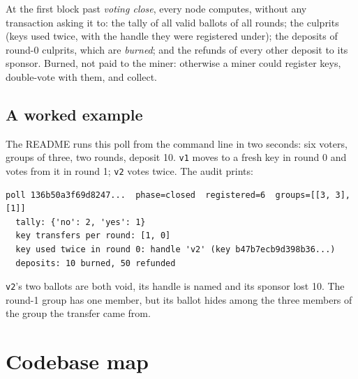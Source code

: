 \documentclass[11pt,a4paper]{article}
\theoremstyle{definition}
\begin{document}
At the first block past \emph{voting close}, every node computes, without
any transaction asking it to: the tally of all valid ballots of all
rounds; the culprits (keys used twice, with the handle they were
registered under); the deposits of round-0 culprits, which are
\emph{burned}; and the refunds of every other deposit to its sponsor.
Burned, not paid to the miner: otherwise a miner could register keys,
double-vote with them, and collect.

\subsection{A worked example}

The README runs this poll from the command line in two seconds: six
voters, groups of three, two rounds, deposit 10. \texttt{v1} moves to a
fresh key in round 0 and votes from it in round 1; \texttt{v2} votes twice.
The audit prints:
\begin{lstlisting}[style=shell]
poll 136b50a3f69d8247...  phase=closed  registered=6  groups=[[3, 3], [1]]
  tally: {'no': 2, 'yes': 1}
  key transfers per round: [1, 0]
  key used twice in round 0: handle 'v2' (key b47b7ecb9d398b36...)
  deposits: 10 burned, 50 refunded
\end{lstlisting}
\texttt{v2}'s two ballots are both void, its handle is named and its
sponsor lost 10. The round-1 group has one member, but its ballot hides
among the three members of the group the transfer came from.

\section{Codebase map}
\label{sec:code}
\end{document}
